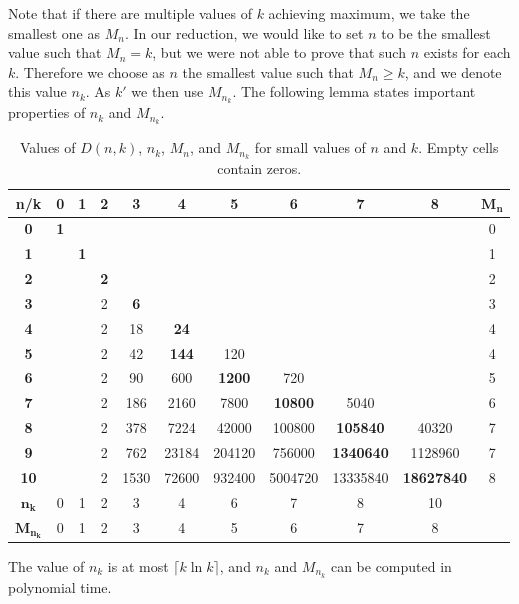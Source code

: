 Note that if there are multiple values
of $k$ achieving maximum, we take the smallest one as $M_n$.  In our
reduction, we would like to set $n$ to be the smallest value such that
$M_n=k$, but we were not able to prove that such $n$ exists for each $k$.
Therefore we choose as $n$ the smallest value such that $M_n\ge k$, and 
we denote this value $n_k$. As $k'$ we then use $M_{n_k}$. The following 
lemma states important properties of $n_k$ and $M_{n_k}$. 

\begin{table}
\begin{center}
\begin{tabular}{|c||c|c|c|c|c|c|c|c|c||c|}\hline
\bf n/k&\bf 0&\bf 1&\bf 2&\bf 3&\bf 4&\bf 5&\bf 6&\bf 7&\bf 8&\bf
$\mathbf{M_n}$\\\hline\hline
\bf 0&{\bf 1}&&&&&&&&&0\\\hline
\bf 1&&\bf 1&&&&&&&&1\\\hline
\bf 2&&&\bf 2&&&&&&&2\\\hline
\bf 3&&&2&\bf 6&&&&&&3\\\hline
\bf 4&&&2&18&\bf 24&&&&&4\\\hline
\bf 5&&&2&42&\bf 144&120&&&&4\\\hline
\bf 6&&&2&90&600&\bf 1200&720&&&5\\\hline
\bf 7&&&2&186&2160&7800&\bf 10800&5040&&6\\\hline
\bf 8&&&2&378&7224&42000&100800&\bf 105840&40320&7\\\hline
\bf 9&&&2&762&23184&204120&756000&\bf 1340640&1128960&7\\\hline
\bf 10&&&2&1530&72600&932400&5004720&13335840&\bf 18627840&8\\
\hline\hline
$\mathbf{n_k}$&0&1&2&3&4&6&7&8&10&\\\hline 
$\mathbf{M_{n_k}}$&0&1&2&3&4&5&6&7&8&\\\hline 
\end{tabular}
\end{center}
\caption{Values of $D(n,k)$, $n_k$, $M_n$, and $M_{n_k}$ for small values of $n$ and $k$. Empty cells contain zeros.}\label{DNKTable}
\end{table}

\begin{lemma}\label{LEMMA:DNKlemma}
The value of $n_k$ is at most $\lceil k\ln k\rceil$, and $n_k$ and
$M_{n_k}$ can be computed in polynomial time.
\end{lemma}

